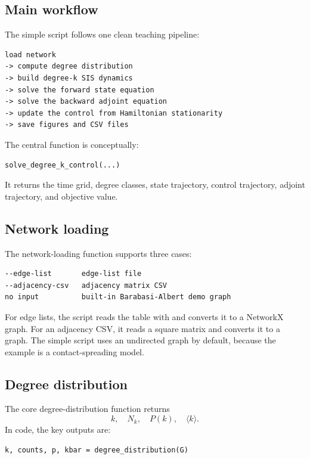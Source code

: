 \documentclass[11pt,a4paper]{article}
\DeclareRobustCommand{\code}[1]{\texttt{\detokenize{#1}}}
\begin{document}
\subsection{Main workflow}

The simple script follows one clean teaching pipeline:

\begin{lstlisting}[style=text]
load network
-> compute degree distribution
-> build degree-k SIS dynamics
-> solve the forward state equation
-> solve the backward adjoint equation
-> update the control from Hamiltonian stationarity
-> save figures and CSV files
\end{lstlisting}

The central function is conceptually:

\begin{lstlisting}[style=py]
solve_degree_k_control(...)
\end{lstlisting}

It returns the time grid, degree classes, state trajectory, control trajectory, adjoint trajectory, and objective value.

\subsection{Network loading}

The network-loading function supports three cases:

\begin{lstlisting}[style=text]
--edge-list       edge-list file
--adjacency-csv   adjacency matrix CSV
no input          built-in Barabasi-Albert demo graph
\end{lstlisting}

For edge lists, the script reads the table with \code{pandas.read_csv} and converts it to a NetworkX graph. For an adjacency CSV, it reads a square matrix and converts it to a graph. The simple script uses an undirected graph by default, because the example is a contact-spreading model.

\subsection{Degree distribution}

The core degree-distribution function returns
\[
  k,\quad N_k,\quad P(k),\quad \langle k\rangle.
\]
In code, the key outputs are:

\begin{lstlisting}[style=py]
k, counts, p, kbar = degree_distribution(G)
\end{lstlisting}
\end{document}
